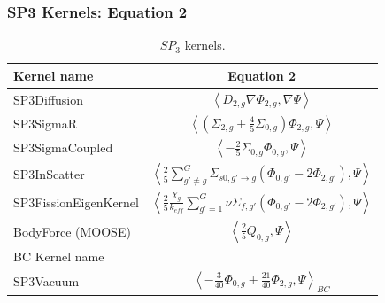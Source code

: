 \begin{frame}
\frametitle{SP3 Kernels: Equation 2}

\begin{table}[htbp!]
  \centering
  \caption{$SP_3$ kernels.}
  \begin{tabular}{lc}
  \toprule
  Kernel name           & Equation 2 \\
  \midrule
  SP3Diffusion           & $\left< D_{2,g} \nabla \Phi_{2,g}, \nabla \Psi \right>$ \\
  SP3SigmaR              & $\left< \left( \Sigma_{2,g} + \frac{4}{5} \Sigma_{0,g} \right) \Phi_{2,g}, \Psi \right>$ \\
  SP3SigmaCoupled        & $\left< - \frac{2}{5} \Sigma_{0,g} \Phi_{0,g}, \Psi \right>$ \\
  SP3InScatter           & $\left< \frac{2}{5} \sum_{g'\ne g}^G \Sigma_{s0,g' \rightarrow g} \left( \Phi_{0,g'} - 2 \Phi_{2,g'} \right), \Psi \right>$ \\
  SP3FissionEigenKernel  & $\left< \frac{2}{5} \frac{\chi_g}{k_{eff}} \sum_{g'=1}^G \nu\Sigma_{f,g'} \left( \Phi_{0,g'} - 2 \Phi_{2,g'} \right), \Psi \right>$ \\
  BodyForce (MOOSE)      & $\left< \frac{2}{5} Q_{0,g}, \Psi \right>$ \\
  \midrule
  BC Kernel name & \\
  \midrule
  SP3Vacuum                & $\left< - \frac{3}{40} \Phi_{0,g} + \frac{21}{40} \Phi_{2,g}, \Psi \right>_{BC}$ \\
  \bottomrule
  \end{tabular}
\end{table}
\end{frame}
